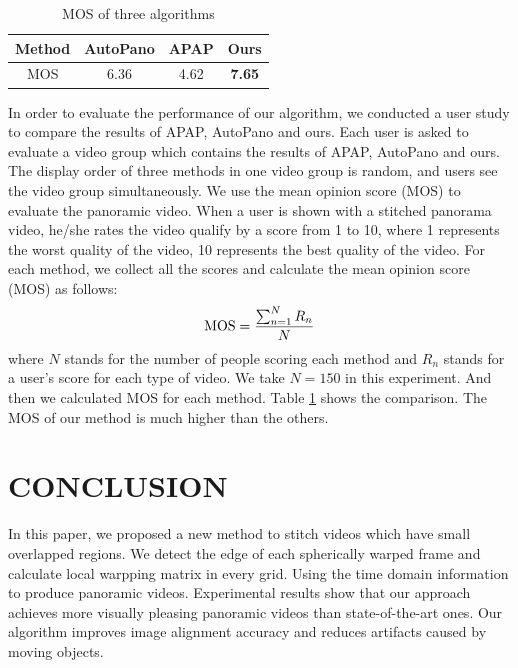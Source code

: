 \documentclass[conference]{IEEEtran}
\begin{document}
\begin{table}[t]
\caption{MOS of three algorithms}
\label{tab1:table1}
\centering
\begin{tabular}{c|c|c|c}
\hline
Method& AutoPano& APAP& Ours\\
\hline
MOS& 6.36& 4.62& \bf{7.65}\\
\hline
\end{tabular}
\end{table}
In order to evaluate the performance of our algorithm, we conducted a user study to compare the results of APAP, AutoPano and ours. 
Each user is asked to evaluate a video group which contains the results of APAP, AutoPano and ours. 
The display order of three methods in one video group is random, and users see the video group simultaneously.
We use the mean opinion score (MOS) to evaluate the panoramic video. When a user is shown with a stitched panorama video, he/she rates the video qualify by a score from 1 to 10, where
1 represents the worst quality of the video, 10 represents the best quality of the video. For each method, we collect all the scores and calculate the mean opinion score (MOS) as 
follows:
\begin{equation}
{\rm MOS}=\frac{\sum^{N}_{n=1}{R_n}}{N}
\end{equation}
where $N$ stands for the number of people scoring each method and $R_n$ stands for a user's score for each type of video. We take $N=150$ in this experiment.
And then we calculated MOS for each method. Table \ref{tab1:table1} shows the comparison. The MOS of our method is much higher than the others.

\section{CONCLUSION}
\label{sec:conclusion}

In this paper, we proposed a new method to stitch videos which have small overlapped regions.
We detect the edge of each spherically warped frame and calculate local warpping matrix in every grid. Using the time domain information to produce panoramic videos. 
Experimental results show that our approach achieves more visually pleasing panoramic videos than state-of-the-art ones. Our algorithm improves image alignment accuracy and reduces artifacts caused by
moving objects.
\end{document}

